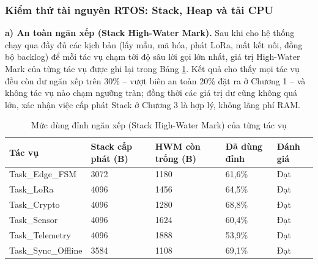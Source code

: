 \subsubsection{Kiểm thử tài nguyên RTOS: Stack, Heap và tải CPU}

\textbf{a) An toàn ngăn xếp (Stack High-Water Mark).} Sau khi cho hệ thống chạy qua đầy đủ các kịch bản (lấy mẫu, mã hóa, phát LoRa, mất kết nối, đồng bộ backlog) để mỗi tác vụ chạm tới độ sâu lời gọi lớn nhất, giá trị High-Water Mark của từng tác vụ được ghi lại trong Bảng \ref{tab:ch5_stack}. Kết quả cho thấy mọi tác vụ đều còn dư ngăn xếp trên $30\%$ -- vượt biên an toàn $20\%$ đặt ra ở Chương 1 -- và không tác vụ nào chạm ngưỡng tràn; đồng thời các giá trị dư cũng không quá lớn, xác nhận việc cấp phát Stack ở Chương 3 là hợp lý, không lãng phí RAM.

\begin{table}[H]
\centering
\caption{Mức dùng đỉnh ngăn xếp (Stack High-Water Mark) của từng tác vụ}
\label{tab:ch5_stack}
\renewcommand{\arraystretch}{1.4}
\small
\begin{tabular}{p{3.2cm} p{2.6cm} p{2.8cm} p{2.2cm} p{1.6cm}}
\hline
\textbf{Tác vụ} & \textbf{Stack cấp phát (B)} & \textbf{HWM còn trống (B)} & \textbf{Đã dùng đỉnh} & \textbf{Đánh giá} \\ \hline
Task\_Edge\_FSM    & 3072 & 1180 & 61,6\% & Đạt \\ 
Task\_LoRa         & 4096 & 1456 & 64,5\% & Đạt \\ 
Task\_Crypto       & 4096 & 1280 & 68,8\% & Đạt \\ 
Task\_Sensor       & 4096 & 1624 & 60,4\% & Đạt \\ 
Task\_Telemetry    & 4096 & 1888 & 53,9\% & Đạt \\
Task\_Sync\_Offline & 3584 & 1108 & 69,1\% & Đạt \\ \hline
\end{tabular}
\end{table}


